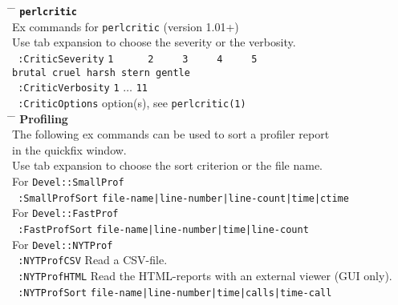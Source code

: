 \documentclass[oneside,10pt,landscape,DIV17]{scrartcl}
\begin{document}
\begin{multicols}{2}
\parbox[t][70mm][t]{120mm}{%
%
\begin{tabbing}
\hspace{30mm} \= \hspace{50mm} \= \kill
%
\textbf{\texttt{perlcritic}}\\[1.0ex]
%
Ex commands for \texttt{perlcritic} (version 1.01+)\\
Use tab expansion to choose the severity or the verbosity.\\[2.0ex]
\texttt{ :CriticSeverity}  \> \texttt{1\ \ \ \ \ \ 2\ \ \ \ \ 3\ \ \ \ \ 4\ \ \ \ \ 5} \\
                           \> \texttt{brutal cruel harsh stern gentle} \\[1.0ex]
\texttt{ :CriticVerbosity} \> \texttt{1} $\ldots$ \texttt{11}\\[1.0ex]
\texttt{ :CriticOptions}   \> option(s), see \texttt{perlcritic(1)}\\[5.5ex]
%
\hspace{30mm} \= \hspace{50mm} \= \kill
%
\large{\textbf{Profiling}}\\[1.0ex]
%
The following ex commands can be used to sort a profiler report \\in the quickfix window.\\
Use tab expansion to choose the sort criterion or the file name.\\[2.0ex]
%
For \texttt{Devel::SmallProf}\\[1.0ex]
\texttt{ :SmallProfSort}   \> \texttt{file-name|line-number|line-count|time|ctime}\\[3.0ex]
%
%
For \texttt{Devel::FastProf}\\[1.0ex]
\texttt{ :FastProfSort}    \> \texttt{file-name|line-number|time|line-count}\\[3.0ex]
%
%
For \texttt{Devel::NYTProf}\\[1.0ex]
\texttt{ :NYTProfCSV}      \> Read a CSV-file.\\[1.0ex]
%
\texttt{ :NYTProfHTML}      \> Read the HTML-reports with an external viewer (GUI only).\\[1.0ex]
%
%
\texttt{ :NYTProfSort}     \> \texttt{file-name|line-number|time|calls|time-call}\\
%
\end{tabbing}
}
\end{multicols}%
%
\end{document}

